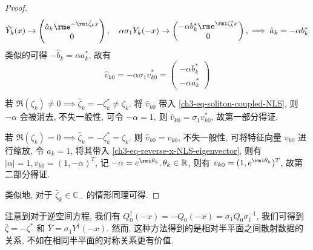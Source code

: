 \begin{proof}
    \begin{equation}
        \hat{Y}_{k}(x) \to \begin{pmatrix} \hat{a}_{k} \rme^{-\rmi \hat{\zeta}_{k} x} \\ 0 \end{pmatrix}, \quad \alpha \sigma_{1} Y_{k}(-x) \to \begin{pmatrix} -\alpha b_{k}^{*} \rme^{\rmi \zeta_{k}^{*} x} \\ 0 \end{pmatrix}, \implies \hat{a}_{k} = -\alpha b_{k}^{*}
    \end{equation}
    类似的可得 $ -\hat{b}_{k} = \alpha a_{k}^{*} $, 故有
    \begin{equation}
        \hat{v}_{k0} = -\alpha \sigma_{1}v_{k0}^{*} = \begin{pmatrix}
            -\alpha b_{k}^{*} \\
            -\alpha a_{k}^{*}
        \end{pmatrix} \label{ch3-eq-reverse-x-NLS-eigenvector}
    \end{equation}

    若 $\Re(\zeta_{k}) \neq 0 \implies \hat{\zeta}_{k} = -\zeta^{*}_{k} \neq \zeta_{k} $. 将 $\hat{v}_{k0} $ 带入 \eqref{ch3-eq-soliton-coupled-NLS}, 则 $ -\alpha $ 会被消去, 不失一般性, 可令 $ -\alpha = 1 $, 则 $ \hat{v}_{k0} = \sigma_{1}v_{k0}^{*} $, 故第一部分得证.

    若 $\Re(\zeta_{k}) = 0 \implies \hat{\zeta}_{k} = -\zeta^{*}_{k} = \zeta_{k} $. 则 $ \hat{v}_{k0} = v_{k0} $, 不失一般性, 可将特征向量 $ v_{k0} $ 进行缩放, 令 $ a_{k} = 1 $, 将其带入 \eqref{ch3-eq-reverse-x-NLS-eigenvector}, 则有 $ |\alpha| = 1, v_{k0} = (1, -\alpha)^{T}$, 记 $ -\alpha = e^{\rmi \theta_{k}}, \theta_{k} \in \mathbb{R}$, 则有 $ v_{k0} = (1, e^{\rmi \theta_{k}})^{T} $, 故第二部分得证.

    类似地, 对于 $ \bar{\zeta}_{k} \in \mathbb{C}_{-} $ 的情形同理可得.
\end{proof}
\begin{remark}
    注意到对于逆空间方程, 我们有 $Q_{0}^{\dagger}(-x) = -Q_{0}(-x) = \sigma_{1} Q_{0} \sigma_{1}^{-1}$, 我们可得到 $\bar{\zeta} = -\zeta^{*}$ 和 $\bar{Y} = \sigma_{1} Y^{\dagger}(-x)$. 然而, 这种方法得到的是相对半平面之间散射数据的关系, 不如在相同半平面的对称关系更有价值.
\end{remark}
